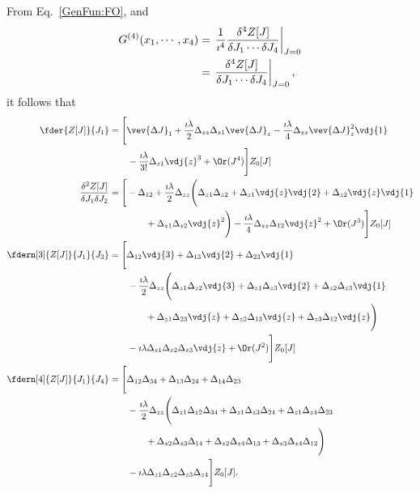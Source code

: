From Eq.~\eqref{GenFun:FO}, and
\begin{align}
  G^{(4)}(x_1,\cdots,x_4) &= \left.\frac{1}{\imath^4}\frac{\delta^4 Z[J]}{\delta J_1\cdots \delta J_4}\right|_{J=0}\notag\\
  &= \left.\frac{\delta^4 Z[J]}{\delta J_1\cdots \delta J_4}\right|_{J=0},
\end{align}
it follows that
\begin{align}
  \fder{Z[J]}{J_1} &= \Bigg[
    \vev{\Delta J}_1
    + \frac{\imath\lambda}{2}\Delta_{zz}\Delta_{z1}\vev{\Delta J}_z
    - \frac{\imath\lambda}{4} \Delta_{zz} \vev{\Delta J}_z^2 \vdj{1} \notag\\
    & \qquad - \frac{\imath\lambda}{3!}\Delta_{z1}\vdj{z}^3
    + \Or(J^4)\Bigg]Z_0[J] \\
  \frac{\delta^2Z[J]}{\delta J_1\delta J_2} &= \Bigg[
    - \Delta_{12}
    + \frac{\imath\lambda}{2} \Delta_{zz} \Bigg(
    \Delta_{z1}\Delta_{z2}
    + \Delta_{z1}\vdj{z}\vdj{2}
    + \Delta_{z2}\vdj{z}\vdj{1}  \notag\\
    & \qquad \qquad
    + \Delta_{z1}\Delta_{z2}\vdj{z}^2\Bigg)
    -\frac{\imath\lambda}{4} \Delta_{zz}\Delta_{12}\vdj{z}^2
    +\Or(J^3)
    \Bigg] Z_0[J]\\
  \fdern[3]{Z[J]}{J_1}{J_3} &= \Bigg[
    \Delta_{12}\vdj{3}
    + \Delta_{13} \vdj{2}
    + \Delta_{23}\vdj{1} \notag\\
    & \qquad - \frac{\imath\lambda}{2} \Delta_{zz} \Bigg(
    \Delta_{z1}\Delta_{z2}\vdj{3}
    + \Delta_{z1}\Delta_{z3}\vdj{2}
    + \Delta_{z2}\Delta_{z3}\vdj{1} \notag\\
    & \qquad \qquad + \Delta_{z1}\Delta_{23}\vdj{z}
    + \Delta_{z2}\Delta_{13}\vdj{z}
    + \Delta_{z3}\Delta_{12}\vdj{z} \Bigg) \notag\\
    & \qquad - \imath\lambda \Delta_{z1}\Delta_{z2}\Delta_{z3}\vdj{z}
    +\Or(J^2) \Bigg]Z_0[J] \\
  \fdern[4]{Z[J]}{J_1}{J_4} &= \Bigg[
    \Delta_{12}\Delta_{34}
    + \Delta_{13}\Delta_{24}
    + \Delta_{14}\Delta_{23} \notag\\
    & \qquad - \frac{\imath\lambda}{2} \Delta_{zz} \Bigg(
    \Delta_{z1}\Delta_{z2}\Delta_{34}
    + \Delta_{z1}\Delta_{z3}\Delta_{24}
    + \Delta_{z1}\Delta_{z4}\Delta_{23} \notag\\
    & \qquad \qquad
    + \Delta_{z2}\Delta_{z3}\Delta_{14}
    + \Delta_{z2}\Delta_{z4}\Delta_{13}
    + \Delta_{z3}\Delta_{z4}\Delta_{12} \Bigg) \notag\\
    & \qquad
    - \imath\lambda \Delta_{z1}\Delta_{z2}\Delta_{z3}\Delta_{z4}
    \Bigg]Z_0[J].
\end{align}
